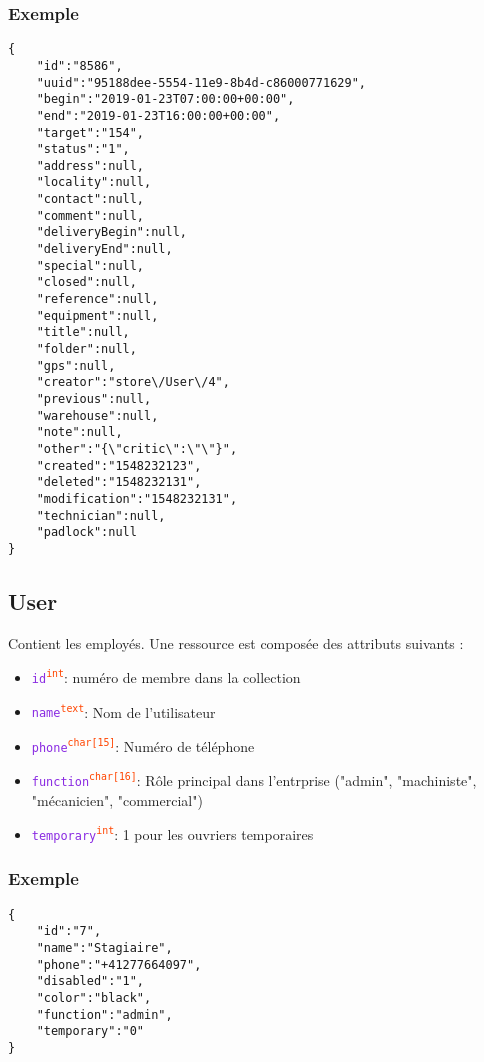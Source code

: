 \documentclass[a4paper,twoside]{article}
\newcommand{\attribut}[1]{\textcolor{BlueViolet}{\texttt{#1}}}
\newcommand{\type}[1]{\textcolor{OrangeRed}{\textsuperscript{\texttt{#1}}}}
\begin{document}
\subsubsection{Exemple}

\begin{verbatim}
{
	"id":"8586",
	"uuid":"95188dee-5554-11e9-8b4d-c86000771629",
	"begin":"2019-01-23T07:00:00+00:00",
	"end":"2019-01-23T16:00:00+00:00",
	"target":"154",
	"status":"1",
	"address":null,
	"locality":null,
	"contact":null,
	"comment":null,
	"deliveryBegin":null,
	"deliveryEnd":null,
	"special":null,
	"closed":null,
	"reference":null,
	"equipment":null,
	"title":null,
	"folder":null,
	"gps":null,
	"creator":"store\/User\/4",
	"previous":null,
	"warehouse":null,
	"note":null,
	"other":"{\"critic\":\"\"}",
	"created":"1548232123",
	"deleted":"1548232131",
	"modification":"1548232131",
	"technician":null,
	"padlock":null
}
\end{verbatim}

\subsection{User}

Contient les employés. Une ressource est composée des attributs suivants :

\begin{itemize}
  \item \attribut{id}\type{int}: numéro de membre dans la collection
  \item \attribut{name}\type{text}: Nom de l'utilisateur
  \item \attribut{phone}\type{char[15]}: Numéro de téléphone
  \item \attribut{function}\type{char[16]}: Rôle principal dans l'entrprise ("admin", "machiniste", "mécanicien", "commercial")
  \item \attribut{temporary}\type{int}: 1 pour les ouvriers temporaires
\end{itemize}

\subsubsection{Exemple}

\begin{verbatim}
{
	"id":"7",
	"name":"Stagiaire",
	"phone":"+41277664097",
	"disabled":"1",
	"color":"black",
	"function":"admin",
	"temporary":"0"
}
\end{verbatim}
\end{document}
